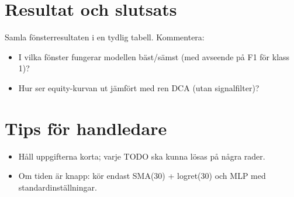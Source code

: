 \documentclass[11pt,a4paper]{scrartcl}
\begin{document}
\section*{Resultat och slutsats}
Samla fönsterresultaten i en tydlig tabell. Kommentera:
\begin{itemize}
  \item I vilka fönster fungerar modellen bäst/sämst (med avseende på F1 för klass 1)?
  \item Hur ser equity-kurvan ut jämfört med ren DCA (utan signalfilter)?
\end{itemize}

\section*{Tips för handledare}
\begin{itemize}
  \item Håll uppgifterna korta; varje TODO ska kunna lösas på några rader.
  \item Om tiden är knapp: kör endast SMA(30) + logret(30) och MLP med standardinställningar.
\end{itemize}
\end{document}

